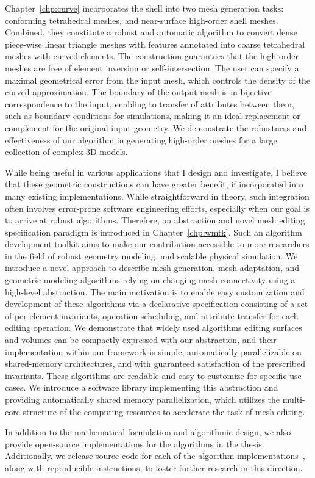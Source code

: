 %

Chapter~\ref*{chp:curve} incorporates the shell into two mesh generation tasks: conforming tetrahedral meshes, and near-surface high-order shell meshes. Combined, they constitute a robust and automatic algorithm to convert dense piece-wise linear triangle meshes with features annotated into coarse tetrahedral meshes with curved elements. The construction guarantees that the high-order meshes are free of element inversion or self-intersection. 
The user can specify a maximal geometrical error from the input mesh, which controls the density of the curved approximation. The boundary of the output mesh is in bijective correspondence to the input, enabling to transfer of attributes between them, such as boundary conditions for simulations, making it an ideal replacement or complement for the original input geometry. We demonstrate the robustness and effectiveness of our algorithm in generating high-order meshes for a large collection of complex 3D models.

While being useful in various applications that I design and investigate, I believe that these geometric constructions can have greater benefit, if incorporated into many existing implementations. While straightforward in theory, such integration often involves error-prone software engineering efforts, especially when our goal is to arrive at robust algorithms. Therefore, an abstraction and novel mesh editing specification paradigm is introduced in Chapter~\ref*{chp:wmtk}. Such an algorithm development toolkit aims to make our contribution accessible to more researchers in the field of robust geometry modeling, and scalable physical simulation.
We introduce a novel approach to describe mesh generation, mesh adaptation, and geometric modeling algorithms relying on changing mesh connectivity using a high-level abstraction. The main motivation is to enable easy customization and development of these algorithms via a declarative specification consisting of a set of per-element invariants, operation scheduling, and attribute transfer for each editing operation.
We demonstrate that widely used algorithms editing surfaces and volumes can be compactly expressed with our abstraction, and their implementation within our framework is simple, automatically parallelizable on shared-memory architectures, and with guaranteed satisfaction of the prescribed invariants. These algorithms are readable and easy to customize for specific use cases.
We introduce a software library implementing this abstraction and providing automatically shared memory parallelization, which utilizes the multi-core structure of the computing resources to accelerate the task of mesh editing.

In addition to the mathematical formulation and algorithmic design, we also provide open-source implementations for the algorithms in the thesis.
Additionally, we release source code for each of the algorithm implementations~\cite{githubScaffoldMap,githubshell,githubbichon}, along with reproducible instructions, to foster further research in this direction.

